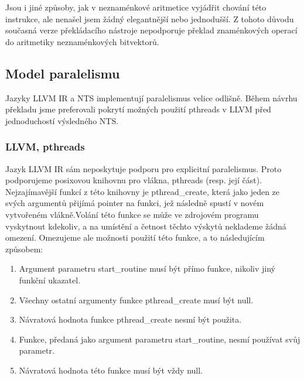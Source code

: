 \documentclass[10pt,a4paper,notitlepage]{report}
\begin{document}
Jsou i jiné způsoby, jak v neznaménkové aritmetice vyjádřit chování této instrukce, ale nenašel jsem žádný elegantnější nebo jednodušší. Z tohoto důvodu současná verze překládacího nástroje nepodporuje překlad znaménkových operací do aritmetiky neznaménkových bitvektorů.


\subsection{Model paralelismu}
\label{subsec:paralelism}

Jazyky LLVM IR a NTS implementují paralelismus velice odlišně. Během návrhu překladu jsme preferovali pokrytí možných použití pthreads v LLVM před jednoduchostí výsledného NTS.

\subsubsection{LLVM, pthreads}Jazyk LLVM IR sám neposkytuje podporu pro explicitní paralelismus. Proto podporujeme posixovou knihovnu pro vlákna, pthreads (resp. její část). Nejzajímavější funkcí z této knihovny je pthread\_create, která jako jeden ze svých argumentů přijímá pointer na funkci, jež následně spustí v novém vytvořeném vlákně.Volání této funkce se může ve zdrojovém programu vyskytnout kdekoliv, a na umístění a četnost těchto výskytů neklademe žádná omezení. Omezujeme ale možnosti použití této funkce, a to následujícím způsobem:

\begin{enumerate}
\item Argument parametru start\_routine musí být přímo funkce, nikoliv jiný funkční ukazatel.
\item Všechny ostatní argumenty funkce pthread\_create musí být null.
\item Návratová hodnota funkce pthread\_create nesmí být použita.
\item Funkce, předaná jako argument parametru start\_routine, nesmí používat svůj parametr.
\item Návratová hodnota této funkce musí být vždy null.
\end{enumerate}
\end{document}
